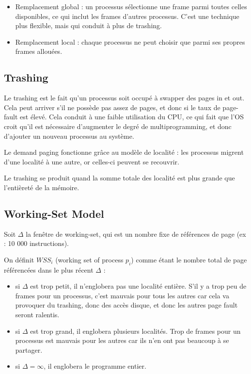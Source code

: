 	\begin{itemize}
		\item Remplacement global : un processus sélectionne une frame parmi toutes celles disponibles, ce qui inclut les frames d'autres processus. C'est une technique plus flexible, mais qui conduit à plus de trashing.
		\item Remplacement local : chaque processus ne peut choisir que parmi ses propres frames allouées.
	\end{itemize}
	
	
	\subsection{Trashing}
	
	Le trashing est le fait qu'un processus soit occupé à swapper des pages in et out. Cela peut arriver s'il ne possède pas assez de pages, et donc si le taux de page-fault est élevé. Cela conduit à une faible utilisation du CPU, ce qui fait que l'OS croit qu'il est nécessaire d'augmenter le degré de multiprogramming, et donc d'ajouter un nouveau processus au système.
	
	
	Le demand paging fonctionne grâce au modèle de localité : les processus migrent d'une localité à une autre, or celles-ci peuvent se recouvrir.
	
	Le trashing se produit quand la somme totale des localité est plus grande que l'entièreté de la mémoire.
	
	\subsection{Working-Set Model}
	
	Soit $\Delta$ la fenêtre de working-set, qui est un nombre fixe de références de page (ex : 10 000 instructions).
	
	On définit $WSS_i$ (working set of process $p_i$) comme étant le nombre total de page référencées dans le plus récent $\Delta$ :
	
	\begin{itemize}
		\item si $\Delta$ est trop petit, il n'englobera pas une localité entière. S'il y a trop peu de frames pour un processus, c'est mauvais pour tous les autres car cela va provoquer du trashing, donc des accès disque, et donc les autres page fault seront ralentis.
		\item si $\Delta$ est trop grand, il englobera plusieurs localités. Trop de frames pour un processus est mauvais pour les autres car ils n'en ont pas beaucoup à se partager.
		\item si $\Delta = \infty$, il englobera le programme entier.
	\end{itemize}
	
